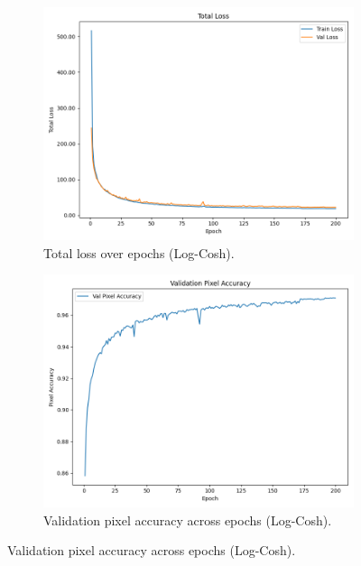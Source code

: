 \begin{figure}[htbp]
    \begin{subfigure}[b]{0.45\textwidth}
        \includegraphics[width=\textwidth]{img/vae_results/200_epochs_128_ls_logcosh/logcosh_total_loss.png}
        \caption{Total loss over epochs (Log-Cosh).}
        \label{fig:logcosh_total_loss}
    \end{subfigure}
    \hfill
    \begin{subfigure}[b]{0.45\textwidth}
        \includegraphics[width=\textwidth]{img/vae_results/200_epochs_128_ls_logcosh/logcosh_val_accuracy.png}
        \caption{Validation pixel accuracy across epochs (Log-Cosh).}
        \label{fig:logcosh_val_acc}
    \end{subfigure}
    

\end{figure}

